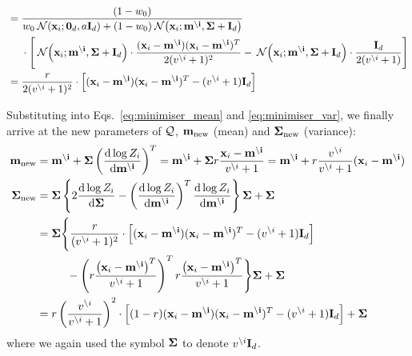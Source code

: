 \documentclass[11pt]{article}
\begin{document}
\begin{align}
			&=
			\frac{(1 - w_0)
				}
			{w_0  \:\mathcal{N}(\mathbf{x}_i; \mathbf{0}_d, a\mathbf{I}_{d})
			+  (1 - w_0)\:\mathcal{N}\!\left(\mathbf{x}_i; \mathbf{m^{\setminus i}}, \mathbf{\Sigma} + \mathbf{I}_d\right)
			}\notag\\
			&\hphantom{=|}\mbox{}\cdot\Bigg[
				\:\mathcal{N}\!\left(\mathbf{x}_i; \mathbf{m^{\setminus i}}, \mathbf{\Sigma} + \mathbf{I}_d\right)
				\cdot\frac{(\mathbf{x}_i - \mathbf{m^{\setminus i}})(\mathbf{x}_i 
				- \mathbf{m^{\setminus i}})^T}{2(v^{\setminus i} + 1)^2}
				- \:\mathcal{N}\!\left(\mathbf{x}_i; \mathbf{m^{\setminus i}}, \mathbf{\Sigma} + \mathbf{I}_d\right)
				\cdot\frac{\mathbf{I}_d}{2(v^{\setminus i} + 1)}
				\Bigg]\\
			&= \frac{r}{2(v^{\setminus i} + 1)^2}\cdot\left[
				(\mathbf{x}_i - \mathbf{m^{\setminus i}})(\mathbf{x}_i - \mathbf{m^{\setminus i}})^T
				- (v^{\setminus i} + 1)\mathbf{I}_d
			\right]
\end{align}

Substituting into Eqs.~\eqref{eq:minimiser_mean} and 
\eqref{eq:minimiser_var}, we finally arrive at the new parameters of 
$\mathcal{Q}$, $\mathbf{m_{\text{new}}}$ (mean) and 
$\mathbf{\Sigma_{\text{new}}}$ (variance):
\begin{align}
	 \vek{m_{\text{new}}} &= \vek{m^{\setminus i}} + \vek{\Sigma}
							\left(\frac{\byd \log Z_i}
									 {\byd \vek{m^{\setminus i}}}\right)^T
	         = \vek{m^{\setminus i}} + \vek{\Sigma}
							r\frac{\vek{x}_i - \vek{m^{\setminus i}}}
										{v^{\setminus i} + 1}
	         = \vek{m^{\setminus i}}
					 		+ r\frac{v^{\setminus i}}{v^{\setminus i} + 1}
							  (\vek{x}_i - \vek{m^{\setminus i}})
					\label{eq:mnew}
					\\
	 \vek{\Sigma_{\text{new}}} &=
		\vek{\Sigma}\left\{
		2\frac{\byd\log Z_i}{\byd \vek{\Sigma}}
			- \left(\frac{\byd\log Z_i}{\byd\vek{m^{\setminus i}}}\right)^T
				\frac{\byd\log Z_i}{\byd\vek{m^{\setminus i}}}\right\}\vek{\Sigma}
			+ \vek{\Sigma} \\
		&=
		\vek{\Sigma}\Bigg\{
			\frac{r}{(v^{\setminus i} + 1)^2}\cdot\left[
				(\vek{x}_i - \vek{m^{\setminus i}})(\vek{x}_i - \vek{m^{\setminus i}})^T
				- (v^{\setminus i} + 1)\unity_d
			\right]\notag\\
		&\hphantom{=\vek{\Sigma}\Bigg\{}\mbox{}
			- \left(r\frac{\left(\vek{x}_i - \vek{m^{\setminus i}}\right)^T}
					{v^{\setminus i} + 1}\right)^T
			r\frac{\left(\vek{x}_i - \vek{m^{\setminus i}}\right)^T}
					{v^{\setminus i} + 1}
				\Bigg\}\vek{\Sigma}
			+ \vek{\Sigma} \\
		&=
			r\left(\frac{v^{\setminus i}}{v^{\setminus i} + 1}\right)^2
			\cdot\left[
				(1 - r)(\vek{x}_i - \vek{m^{\setminus i}})(\vek{x}_i - \vek{m^{\setminus i}})^T
				- (v^{\setminus i} + 1)\unity_d
			\right]
			+ \vek{\Sigma}
			\label{eq:sigma_new}
\end{align}
where we again used the symbol $\mathbf{\Sigma}$ to denote $v^{\setminus 
i}\mathbf{I}_d$.
\end{document}
